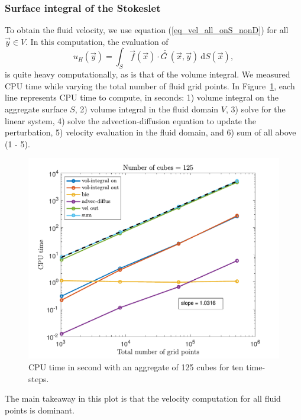 \subsubsection{Surface integral of the Stokeslet}
To obtain the fluid velocity, we use equation (\ref{eq_vel_all_onS_nonD}) for all $\vec{y} \in V$. In this computation, the evaluation of
\begin{equation}
	u_H(\vec{y})  
	= \int_S \vec{f}(\vec{x}) \cdot \bar{\bar{G \ }}( \vec{x}, \vec{y}) \ \text{d} S(\vec{x}),
	\label{eq_uH}
\end{equation}
is quite heavy computationally, as is that of the volume integral. 
We measured CPU time while varying the total number of fluid grid points. 
In Figure~\ref{fig_time_fmm_sum}, each line represents CPU time to compute, in seconds: 1) volume integral on the aggregate surface $S$, 2) volume integral in the fluid domain $V$, 3) solve for the linear system, 4) solve the advection-diffusion equation to update the perturbation, 5) velocity evaluation in the fluid domain, and 6) sum of all above (1 - 5).
\begin{figure}[ht]
	\begin{center}
		\includegraphics[scale=0.45]{./figures/fig_time_varNx5}
	\caption{CPU time in second with an aggregate of 125 cubes for ten time-steps.}
	\label{fig_time_fmm_sum}
\end{center}
\end{figure}
The main takeaway in this plot is that the velocity computation for all fluid points is dominant. 
